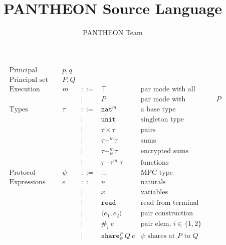 \documentclass[10pt]{article}
\title{PANTHEON Source Language}
\author{PANTHEON Team}
\newcommand{\kw}[1]{\ensuremath{\mathtt{#1}}}
\newcommand{\tnat}{\ensuremath{\mathtt{nat}}}
\newcommand{\tlist}[1]{\ensuremath{\mathtt{list}~{#1}}}
\newcommand{\tprod}[2]{\ensuremath{{#1} \times {#2}}}
\newcommand{\isec}{\ensuremath{\mathtt{pmap}}}
\newcommand{\eshare}[4]{\ensuremath{\kw{share}^{#2}_{#1}~{#3}~{#4}}}
\newcommand{\esharemap}[3]{\ensuremath{\kw{sharemap}_{#1}~{#2}~{#3}}}
\newcommand{\econcat}[2]{\ensuremath{{#1} +\!\!+~ {#2}}}
\newcommand{\eaccval}[2]{\ensuremath{{#1}.{#2}}}
\newcommand{\eread}{\ensuremath{\kw{read}}}
\newcommand{\epair}[2]{\ensuremath{\langle {#1}, {#2} \rangle}}
\newcommand{\eproj}[2]{\ensuremath{\kw{\#}}_{#1}~{#2}}
\begin{document}
\maketitle

\begin{figure}[h]
  \centering
  \[\begin{array}{rlcll}
      \text{Principal} & p, q \\
      \text{Principal set} & P, Q \\
    \text{Execution modes} & m  & ::=  & \top & \text{par mode with all principals}\\
                 && \mid & P & \text{par mode with principals $P$} \\      
      \text{Types} & \tau & ::=  & \tnat^m & \text{a base type} \\
                       && \mid & \mathtt{unit} & \text{singleton type} \\
                       && \mid & \tprod{\tau}{\tau} & \text{pairs} \\
                       && \mid & \tau +^m \tau & \text{sums} \\
                       && \mid & \tau +^m_\psi \tau & \text{encrypted sums} \\
                       && \mid & \tau \rightarrow^m \tau & \text{functions} \\
      \text{Protocol} & \psi & ::= & ... & \text{MPC type} \\
      \text{Expressions} & e & ::= & n & \text{naturals} \\
                       && \mid & x & \text{variables} \\
                       && \mid & \eread & \text{read from terminal}\\
                       && \mid & \epair{e_1}{e_2} & \text{pair construction}\\
                       && \mid & \eproj{i}{e} & \text{pair elem, }i \in \{1,2\}\\
                       && \mid & \eshare{\psi}{P}{Q}{e} & \text{$\psi$ shares at $P$ to $Q$} \\

\end{array}\]
\end{figure}
\end{document}
